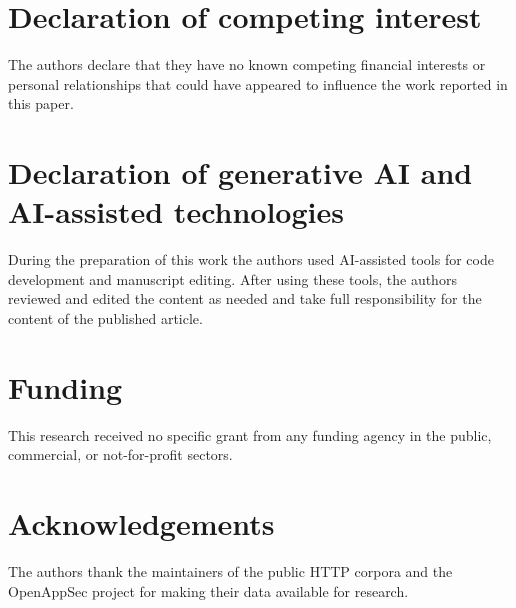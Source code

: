 \documentclass[preprint,11pt]{elsarticle}
\begin{document}
\section*{Declaration of competing
interest}\label{declaration-of-competing-interest}

The authors declare that they have no known competing financial
interests or personal relationships that could have appeared to
influence the work reported in this paper.

\section*{Declaration of generative AI and AI-assisted
technologies}\label{declaration-of-generative-ai-and-ai-assisted-technologies}

During the preparation of this work the authors used AI-assisted tools
for code development and manuscript editing. After using these tools,
the authors reviewed and edited the content as needed and take full
responsibility for the content of the published article.

\section*{Funding}\label{funding}

This research received no specific grant from any funding agency in the
public, commercial, or not-for-profit sectors.

\section*{Acknowledgements}\label{acknowledgements}

The authors thank the maintainers of the public HTTP corpora and the
OpenAppSec project for making their data available for research.



\end{document}
